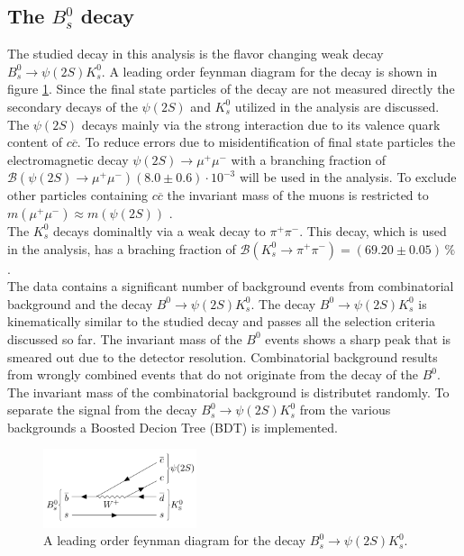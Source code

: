 \subsection{The $B_s^0$ decay}
The studied decay in this analysis is the flavor changing weak decay $B_s^0 \rightarrow \psi(2S) K_s^0$.
A leading order feynman diagram for the decay is shown in figure \ref{f2}. 
Since the final state particles of the decay are not measured directly the secondary decays of the $\psi(2S)$ and $K_s^0$ utilized in the analysis 
are discussed. \\
The $\psi(2S)$ decays mainly via the strong interaction due to its valence quark content of $c \overline{c}$. 
To reduce errors due to misidentification of final state 
particles the electromagnetic decay $\psi(2S) \rightarrow \mu^+ \mu^-$ with a branching fraction of $\mathcal{B}(\psi(2S) \rightarrow \mu^+ \mu^-) 
(8.0 \pm 0.6) \cdot 10^{-3}$ \cite{pdg} will be used in the analysis. To exclude other particles containing $c\overline{c}$ 
the invariant mass of the muons is restricted to $m(\mu^+ \mu^- ) \approx m(\psi(2S))$ .\\ 
The $K_s^0$ decays dominaltly via a weak decay to $\pi^+ \pi^-$. This decay, which is used in the analysis, has a braching fraction of 
$\mathcal{B}(K_s^0 \rightarrow \pi^+ \pi^-) = (69.20 \pm 0.05) \, \%$ \cite{pdg}. \\
The data contains a significant number of background events from combinatorial background and the decay $B^0 \rightarrow \psi(2S) K_s^0$. 
The decay $B^0 \rightarrow \psi(2S) K_s^0$ is kinematically similar to the studied decay and passes all the selection criteria discussed so far. 
The invariant mass of the $B^0$ events shows a sharp peak that is smeared out due to the detector resolution. 
Combinatorial background results from wrongly combined events that do not originate from the decay of the $B^0$. The invariant mass of the 
combinatorial background is distributet randomly. 
To separate the signal from the decay $B_s^0 \rightarrow \psi(2S) K_s^0$ from the various backgrounds a Boosted Decion Tree (BDT) is implemented. 

  \begin{figure}[!htb]
    \centering
    \includegraphics[width=0.4\textwidth]{graphics/image.png}
    \caption{A leading order feynman diagram for the decay $B_s^0 \rightarrow \psi(2S) K_s^0$. \cite{sample}}
    \label{f2}
  \end{figure}